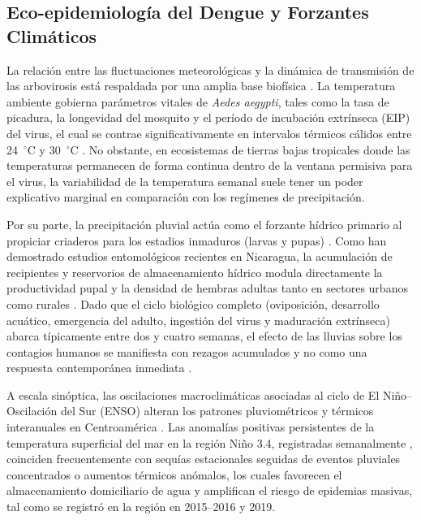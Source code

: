 \documentclass[11pt,a4paper]{article}
\begin{document}
\subsection{Eco-epidemiología del Dengue y Forzantes Climáticos}
La relación entre las fluctuaciones meteorológicas y la dinámica de transmisión de las arbovirosis está respaldada por una amplia base biofísica \parencite{mordecai2019thermal, morin2013climate}. La temperatura ambiente gobierna parámetros vitales de \textit{Aedes aegypti}, tales como la tasa de picadura, la longevidad del mosquito y el período de incubación extrínseca (EIP) del virus, el cual se contrae significativamente en intervalos térmicos cálidos entre 24~$^\circ$C y 30~$^\circ$C \parencite{mordecai2017detecting}. No obstante, en ecosistemas de tierras bajas tropicales donde las temperaturas permanecen de forma continua dentro de la ventana permisiva para el virus, la variabilidad de la temperatura semanal suele tener un poder explicativo marginal en comparación con los regímenes de precipitación.

\medskip

Por su parte, la precipitación pluvial actúa como el forzante hídrico primario al propiciar criaderos para los estadios inmaduros (larvas y pupas) \parencite{bowman2014assessing}. Como han demostrado estudios entomológicos recientes en Nicaragua, la acumulación de recipientes y reservorios de almacenamiento hídrico modula directamente la productividad pupal y la densidad de hembras adultas tanto en sectores urbanos como rurales \parencite{suazo2026abundance}. Dado que el ciclo biológico completo (oviposición, desarrollo acuático, emergencia del adulto, ingestión del virus y maduración extrínseca) abarca típicamente entre dos y cuatro semanas, el efecto de las lluvias sobre los contagios humanos se manifiesta con rezagos acumulados y no como una respuesta contemporánea inmediata \parencite{morin2013climate, anyamba2019global}.

\medskip

A escala sinóptica, las oscilaciones macroclimáticas asociadas al ciclo de El Niño--Oscilación del Sur (ENSO) alteran los patrones pluviométricos y térmicos interanuales en Centroamérica \parencite{anyamba2019global}. Las anomalías positivas persistentes de la temperatura superficial del mar en la región Niño 3.4, registradas semanalmente \parencite{noaa_cpc_weekly_sst}, coinciden frecuentemente con sequías estacionales seguidas de eventos pluviales concentrados o aumentos térmicos anómalos, los cuales favorecen el almacenamiento domiciliario de agua y amplifican el riesgo de epidemias masivas, tal como se registró en la región en 2015--2016 y 2019.
\end{document}
